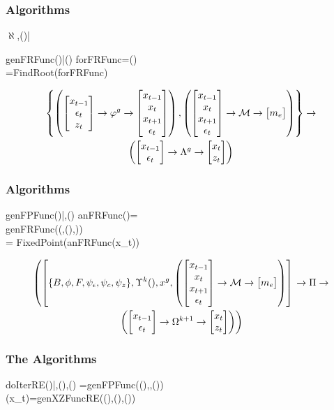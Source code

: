 \documentclass[letter]{beamer}
\begin{document}
\begin{frame}
  \frametitle{Algorithms}
  

\begin{pseudocode}{$\aleph$}{\xtGuess,()|\linMod}
\RETURN{\xzFunc\tArgZ}  
\end{pseudocode}




\begin{pseudocode}{genFRFunc}{\xzFunc()|\modEqns()}
forFRFunc\tArgZ=\modEqns(\xzFunc\tArgZ)\\
\frFunc\tArg=FindRoot(forFRFunc\tArgZ)\\
\RETURN{\frFunc\tArg}  
\end{pseudocode}
\begin{gather}
\left \{
\left (  \begin{bmatrix} x_{t-1}\\ \epsilon_t\\z_t \end{bmatrix} \rightarrow {\varphi^g} \rightarrow \begin{bmatrix} x_{t-1}\\ x_t\\x_{t+1}\\ \epsilon_t \end{bmatrix} \right )
,
\left (  \begin{bmatrix} x_{t-1}\\x_{t}\\x_{t+1}\\ \epsilon_t \end{bmatrix} \rightarrow \mathcal{M} \rightarrow  \begin{bmatrix} m_e \end{bmatrix} \right )
 \right \}
 \rightarrow\\
\left (  \begin{bmatrix} x_{t-1}\\ \epsilon_t \end{bmatrix}  \rightarrow  {\Lambda^g} \rightarrow  \begin{bmatrix} x_t\\z_t \end{bmatrix}  \right )
\end{gather}


\end{frame}


 \begin{frame}
   \frametitle{Algorithms}
   

 \begin{pseudocode}{genFPFunc}{()|\linMod,\modEqns()}
 anFRFunc(\xtGuess)=\\genFRFunc(\aleph(\linMod,(),\xtGuess))\\
\tArg=
 FixedPoint(anFRFunc(x_t))\\
\end{pseudocode}
{\small
\begin{gather}
  \label{eq:2}
\fMap{\Pi}
{\left [\linMod, \XZExp{k}(),x^g,
\modEqnsMap
\right ] \right .}{\\ \left .
\fpFuncMap
}
\end{gather}
}

\end{frame}



\begin{frame}
  \frametitle{The Algorithms}


 \begin{pseudocode}{doIterRE}{()|\linMod,\modEqns(),\epsDist()}
 \tArg=genFPFunc((),\linMod,\modEqns())\\
 (x_t)=genXZFuncRE((),(),\epsDist())\\
 \end{pseudocode}
 \end{frame}


 
 
\end{document}
